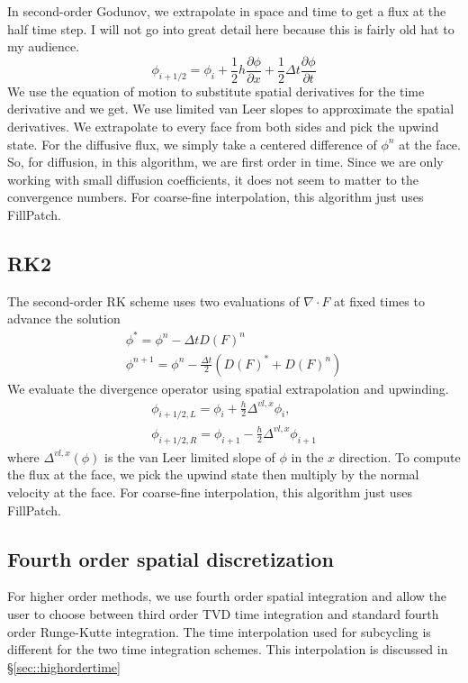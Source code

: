 \documentclass{article}
\newcommand{\dt}{{\Delta t}}
\newcommand{\dx}{{h}}
\newcommand{\half}{\frac{1}{2}}
\begin{document}
In second-order Godunov, we extrapolate in space and time to get a
flux at the half time step.   I will not go into great detail here
because this is fairly old hat to my audience.
$$
\phi_{i+1/2} = \phi_i + \half\dx \frac{\partial \phi}{\partial x} + \half\dt \frac{\partial\phi}{\partial t}
$$
We use the equation of motion to substitute spatial derivatives for
the time derivative and we get.   We use  limited van Leer slopes to
approximate the spatial derivatives.  We extrapolate to every face
from both sides and pick the upwind state.   For the diffusive flux,
we simply take a centered difference of $\phi^n$ at the face.  So, for
diffusion, in this algorithm, we are first order in time.   Since we
are only working with small diffusion coefficients, it does not seem
to matter to the convergence numbers.   For coarse-fine interpolation,
this algorithm just uses FillPatch.

\subsection{RK2}

The second-order RK scheme uses two evaluations of $\nabla \cdot F$ at
fixed times to advance the solution
$$
\begin{array}{l}
\phi^* = \phi^n - \dt D(F)^n\\
\phi^{n+1} = \phi^n - \frac{\dt}{2} (D(F)^* + D(F)^n)
\end{array}
$$
We evaluate the divergence operator using spatial extrapolation and
upwinding.
$$
\begin{array}{l}
\phi_{i+1/2, L} = \phi_i + \frac{\dx}{2} \Delta^{vl,x} \phi_i, \\
\phi_{i+1/2, R} = \phi_{i+1} - \frac{\dx}{2} \Delta^{vl,x} \phi_{i+1}
\end{array}
$$
where $\Delta^{vl,x}(\phi)$ is the van Leer limited slope of $\phi$ in
the $x$ direction.   To compute the flux at the face, we pick the
upwind state then multiply by the normal velocity at the face.   
 For coarse-fine interpolation,  this algorithm just uses FillPatch.

\subsection{Fourth order spatial discretization}

For higher order methods, we use fourth order spatial integration and
allow the user to choose between third order TVD time integration and
standard fourth order Runge-Kutte integration.    The time
interpolation used for subcycling is different for the two time
integration schemes.   This interpolation is discussed in \S \ref{sec::highordertime}
\end{document}
